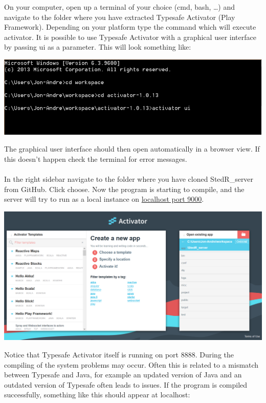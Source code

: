 On your computer, open up a terminal of your choice (cmd, bash, \dots) and navigate to the folder where you have extracted Typesafe Activator (Play Framework). Depending on your platform type the command which will execute activator. It is possible to use Typesafe Activator with a graphical user interface by passing ui as a parameter. This will look something like:
\begin{center}
\includegraphics[scale=0.8]{guide/activator1.png} 
\end{center}
The graphical user interface should then open automatically in a browser view. If this doesn't happen check the terminal for error messages.

\paragraph{}
In the right sidebar navigate to the folder where you have cloned StedR\_server from GitHub. Click choose. Now the program is starting to compile, and the server will try to run as a local instance on \href{http://127.0.0.1:9000}{localhost port 9000}. 
\begin{center}
\includegraphics[scale=0.4]{guide/activator2.png} 
\end{center}

Notice that Typesafe Activator itself is running on port 8888. During the compiling of the system problems may occur. Often this is related to a mismatch between Typesafe and Java, for example an updated version of Java and an outdated version of Typesafe often leads to issues. If the program is compiled successfully, something like this should appear at localhost: 

